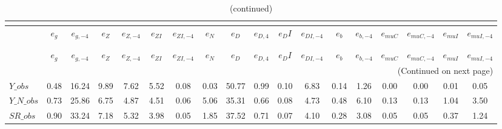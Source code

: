  
\begin{center}
\begin{longtable}{lccccccccccccccccc} 
\caption{VARIANCE DECOMPOSITION (in percent)}\\
 \label{Table:th_var_decomp_uncond}\\
\toprule 
$               $	 & 	 $           {e_g}$	 & 	 $      {e_{g,-4}}$	 & 	 $           {e_Z}$	 & 	 $      {e_{Z,-4}}$	 & 	 $        {e_{ZI}}$	 & 	 $     {e_{ZI,-4}}$	 & 	 $           {e_N}$	 & 	 $           {e_D}$	 & 	 $       {e_{D,4}}$	 & 	 $          {e_DI}$	 & 	 $     {e_{DI,-4}}$	 & 	 $           {e_b}$	 & 	 $      {e_{b,-4}}$	 & 	 $       {e_{muC}}$	 & 	 $    {e_{muC,-4}}$	 & 	 $       {e_{muI}}$	 & 	 $    {e_{muI,-4}}$\\
\midrule \endfirsthead 
\caption{(continued)}\\
 \toprule \\ 
$               $	 & 	 $           {e_g}$	 & 	 $      {e_{g,-4}}$	 & 	 $           {e_Z}$	 & 	 $      {e_{Z,-4}}$	 & 	 $        {e_{ZI}}$	 & 	 $     {e_{ZI,-4}}$	 & 	 $           {e_N}$	 & 	 $           {e_D}$	 & 	 $       {e_{D,4}}$	 & 	 $          {e_DI}$	 & 	 $     {e_{DI,-4}}$	 & 	 $           {e_b}$	 & 	 $      {e_{b,-4}}$	 & 	 $       {e_{muC}}$	 & 	 $    {e_{muC,-4}}$	 & 	 $       {e_{muI}}$	 & 	 $    {e_{muI,-4}}$\\
\midrule \endhead 
\midrule \multicolumn{18}{r}{(Continued on next page)} \\ \bottomrule \endfoot 
\bottomrule \endlastfoot 
$Y\_obs         $	 & 	            0.48	 & 	           16.24	 & 	            9.89	 & 	            7.62	 & 	            5.52	 & 	            0.08	 & 	            0.03	 & 	           50.77	 & 	            0.99	 & 	            0.10	 & 	            6.83	 & 	            0.14	 & 	            1.26	 & 	            0.00	 & 	            0.00	 & 	            0.01	 & 	            0.05 \\ 
$Y\_N\_obs      $	 & 	            0.73	 & 	           25.86	 & 	            6.75	 & 	            4.87	 & 	            4.51	 & 	            0.06	 & 	            5.06	 & 	           35.31	 & 	            0.66	 & 	            0.08	 & 	            4.73	 & 	            0.48	 & 	            6.10	 & 	            0.13	 & 	            0.13	 & 	            1.04	 & 	            3.50 \\ 
$SR\_obs        $	 & 	            0.90	 & 	           33.24	 & 	            7.18	 & 	            5.32	 & 	            3.98	 & 	            0.05	 & 	            1.85	 & 	           37.52	 & 	            0.71	 & 	            0.07	 & 	            4.10	 & 	            0.28	 & 	            3.08	 & 	            0.05	 & 	            0.05	 & 	            0.37	 & 	            1.24 \\ 

\end{longtable}
\end{center}
